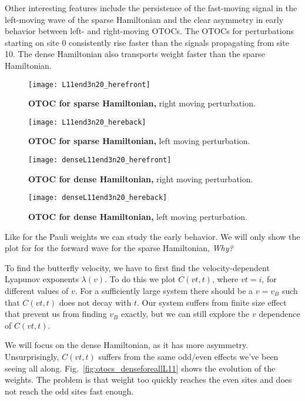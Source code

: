 Other interesting features include the persistence of the fast-moving signal in the left-moving wave of the sparse Hamiltonian and the clear asymmetry in early behavior between left- and right-moving OTOCs. The OTOCs for perturbations starting on site 0 consistently rise faster than the signals propagating from site 10. The dense Hamiltonian also transports weight faster than the sparse Hamiltonian.

\begin{figure}
	\centering
	\texttt{[image: L11end3n20\_herefront]}
	\caption{\textbf{OTOC for sparse Hamiltonian,} right moving perturbation.}
	\label{fig:L11end3n20_herefront}
\end{figure}

\begin{figure}
	\centering
	\texttt{[image: L11end3n20\_hereback]}
	\caption{\textbf{OTOC for sparse Hamiltonian,} left moving perturbation.}
	\label{fig:L11end3n20_hereback}
\end{figure}

\begin{figure}
	\centering
	\texttt{[image: denseL11end3n20\_herefront]}
	\caption{\textbf{OTOC for dense Hamiltonian,} right moving perturbation.}
	\label{fig:denseL11end3n20_herefront}
\end{figure}

\begin{figure}
	\centering
	\texttt{[image: denseL11end3n20\_hereback]}
	\caption{\textbf{OTOC for dense Hamiltonian,} left moving perturbation.}
	\label{fig:denseL11end3n20_hereback}
\end{figure}

Like for the Pauli weights we can study the early behavior. We will only show the plot for for the forward wave for the sparse Hamiltonian, \emph{Why?}

To find the butterfly velocity, we have to first find the velocity-dependent Lyapunov exponents $\lambda(v)$. To do this we plot $C(vt,t)$, where $vt=i$, for different values of $v$. For a sufficiently large system there should be a $v=v_B$ such that $C(vt,t)$ does not decay with $t$. Our system suffers from finite size effect that prevent us from finding $v_B$ exactly, but we can still explore the $v$ dependence of $C(vt,t)$.

We will focus on the dense Hamiltonian, as it has more asymmetry. Unsurprisingly, $C(vt,t)$ suffers from the same odd/even effects we've been seeing all along. Fig.~\ref{fig:otocs_denseforeallL11} shows the evolution of the weights. The problem is that weight too quickly reaches the even sites and does not reach the odd sites fast enough.


